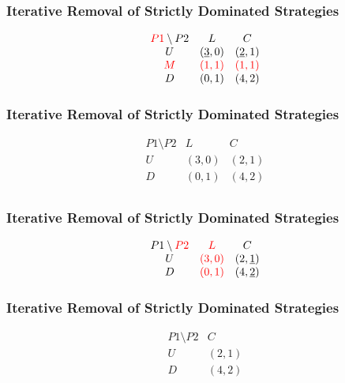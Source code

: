 \begin{frame}
    \frametitle{Iterative Removal of Strictly Dominated Strategies}
    \begin{equation*}
        \begin{matrix}
            \textcolor{red}{P1} \setminus P2 & L & C \\
            U & (\underline{3},0) & (\underline{2},1) \\
            \textcolor{red}{M} & \textcolor{red}{(1,1)} & \textcolor{red}{(1,1)} \\
            D & (0,1) & (4,2) \\
        \end{matrix}
    \end{equation*}
\end{frame}


\begin{frame}
    \frametitle{Iterative Removal of Strictly Dominated Strategies}
    \begin{equation*}
        \begin{matrix}
            P1\setminus P2 & L & C \\
            U & (3,0) & (2,1) \\
            D & (0,1) & (4,2) \\
        \end{matrix}
    \end{equation*}
\end{frame}


\begin{frame}
    \frametitle{Iterative Removal of Strictly Dominated Strategies}
    \begin{equation*}
        \begin{matrix}
            P1\setminus \textcolor{red}{P2} & \textcolor{red}{L} & C \\
            U & \textcolor{red}{(3,0)} & (2,\underline{1}) \\
            D & \textcolor{red}{(0,1)} & (4,\underline{2}) \\
        \end{matrix}
    \end{equation*}
\end{frame}


\begin{frame}
    \frametitle{Iterative Removal of Strictly Dominated Strategies}
    \begin{equation*}
        \begin{matrix}
            P1\setminus P2 & C \\
            U & (2,1) \\
            D & (4,2) \\
        \end{matrix}
    \end{equation*}
\end{frame}


